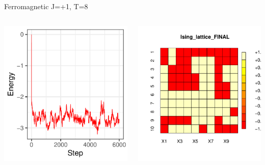 \documentclass{beamer}
\begin{document}
\begin{frame}{Ferromagnetic J=+1, T=8}
\begin{columns}
\begin{column}{0.5\textwidth}
    \begin{center}
     \includegraphics[width=\textwidth]{Pic/J+1_10_6000_T=8_ENERGY.pdf}
     \end{center}
\end{column}
\begin{column}{0.5\textwidth}
    \begin{center}
     \includegraphics[width=\textwidth]{Pic/J+1_10_6000_T=8_FINAL.pdf}

\end{center}
\end{column}
\end{columns}
\end{frame}
\end{document}
